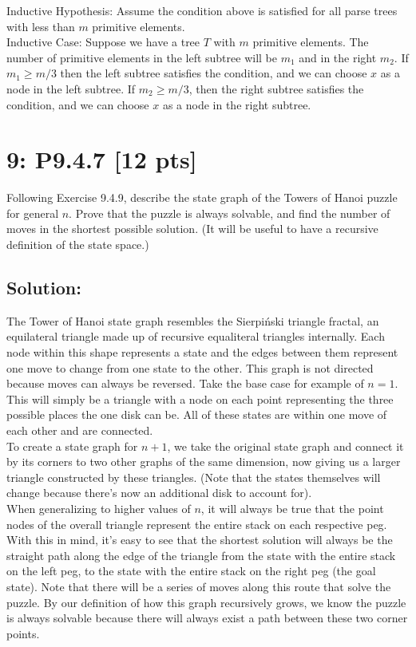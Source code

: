 \documentclass[12pt]{article}
\begin{document}
Inductive Hypothesis: Assume the condition above is satisfied for all parse trees with less than $m$ primitive elements.\\

Inductive Case: Suppose we have a tree $T$ with $m$ primitive elements. The number of primitive elements in the left subtree will be $m_1$ and in the right $m_2$. If $m_1 \geq m/3$ then the left subtree satisfies the condition, and we can choose $x$ as a node in the left subtree. If $m_2 \geq m/3$, then the right subtree satisfies the condition, and we can choose $x$ as a node in the right subtree. 



\newpage
\section*{\textbf{9: P9.4.7} [12 pts]}
Following Exercise 9.4.9, describe the state graph of the Towers of Hanoi puzzle for general $n$. Prove that the puzzle is always solvable, and find the number of moves in the shortest possible solution. (It will be useful to have a recursive definition of the state space.)


\subsection*{\textbf{Solution:}}
The Tower of Hanoi state graph resembles the Sierpiński triangle fractal, an equilateral triangle made up of recursive equaliteral triangles internally. Each node within this shape represents a state and the edges between them represent one move to change from one state to the other. This graph is not directed because moves can always be reversed. Take the base case for example of $n=1$. This will simply be a triangle with a node on each point representing the three possible places the one disk can be. All of these states are within one move of each other and are connected.\\

\noindent
To create a state graph for $n+1$, we take the original state graph and connect it by its corners to two other graphs of the same dimension, now giving us a larger triangle constructed by these triangles. (Note that the states themselves will change because there's now an additional disk to account for).\\

\noindent
When generalizing to higher values of $n$, it will always be true that the point nodes of the overall triangle represent the entire stack on each respective peg. With this in mind, it's easy to see that the shortest solution will always be the straight path along the edge of the triangle from the state with the entire stack on the left peg, to the state with the entire stack on the right peg (the goal state). Note that there will be a series of moves along this route that solve the puzzle. By our definition of how this graph recursively grows, we know the puzzle is always solvable because there will always exist a path between these two corner points.\\
\end{document}
